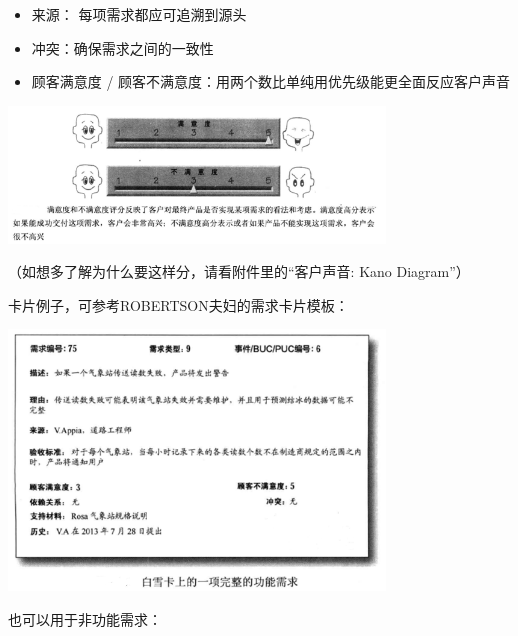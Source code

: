 \begin{itemize}
\tightlist
\item
  来源： 每项需求都应可追溯到源头
\end{itemize}

\begin{itemize}
\tightlist
\item
  冲突：确保需求之间的一致性
\end{itemize}

\begin{itemize}
\tightlist
\item
  顾客满意度 / 顾客不满意度：用两个数比单纯用优先级能更全面反应客户声音
\end{itemize}



\includegraphics[width=10cm]{9_用户故事1.png}

\begin{description}
\tightlist
\item[]
（如想多了解为什么要这样分，请看附件里的``客户声音: Kano Diagram''）
\end{description}

卡片例子，可参考ROBERTSON夫妇的需求卡片模板：


\includegraphics[width=10cm]{9_用户故事2.png}

也可以用于非功能需求：\\

